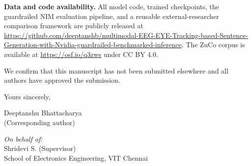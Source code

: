 \documentclass[12pt]{article}
\begin{document}
\textbf{Data and code availability.}
All model code, trained checkpoints, the guardrailed NIM evaluation pipeline,
and a reusable external-researcher comparison framework are publicly released
at \url{https://github.com/deeptanshb/multimodal-EEG-EYE-Tracking-based-Sentence-Generation-with-Nvidia-guardrailed-benchmarked-inference}.
The ZuCo corpus is available at \url{https://osf.io/q3zws} under CC BY 4.0.

We confirm that this manuscript has not been submitted elsewhere and all
authors have approved the submission.

\bigskip
Yours sincerely,

\bigskip
\bigskip
Deeptanshu Bhattacharya\\
(Corresponding author)

\bigskip
\textit{On behalf of:}\\
Shridevi S. (Supervisor)\\
School of Electronics Engineering, VIT Chennai
\end{document}

